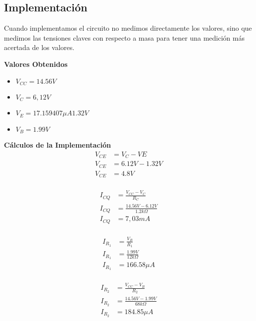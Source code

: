 \begin{multicols}{2}
		\subsection{Implementación}
			\sangria{}Cuando implementamos el circuito no medimos directamente los valores, sino que medimos las tensiones claves con respecto a masa para tener una medición más acertada de los valores.

			\textbf{Valores Obtenidos}
			\begin{itemize}
				\item $V_{CC} = 14.56V$\\
                \item $V_{C} = 6,12V$\\
                \item $V_{E}= 17.159407\mu A1.32V$\\
                \item $V_{B} = 1.99V$\\
            \end{itemize}

			\textbf{Cálculos de la Implementación}
			\begin{align*}
				V_{CE} &= V_{C}-V{E}\\
				V_{CE} &= 6.12V - 1.32V\\
				V_{CE} &= 4.8V\\
			\end{align*}

			\begin{align*}
				I_{CQ}&=\frac{V_{CC}-V_{C}}{R_{C}}\\
				I_{CQ}&=\frac{14.56 V - 6.12 V}{1.2 k\Omega}\\
				I_{CQ}&=7,03 mA\\
			\end{align*}

\newpage
			\begin{align*}
				I_{R_1}&=\frac{V_B}{R_1}\\
				I_{R_1}&=\frac{1.99V}{12k\Omega}\\
				I_{R_1}&=166.58\mu A\\
            \end{align*}

			\begin{align*}
				I_{R_2}&=\frac{V_{CC} - V_B}{R_2}\\
				I_{R_2}&=\frac{14.56V - 1.99V}{68k\Omega}\\
				I_{R_2}&=184.85\mu A\\
			\end{align*}


\end{multicols}
